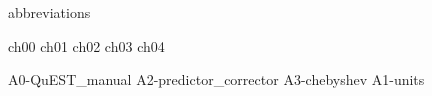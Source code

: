 \documentclass[mixedtoc]{msu-thesis-custom}
\begin{document}
\begin{center}
  \smiley{}
\end{center}



\clearpage
\SingleSpacing
\tableofcontents* %
\clearpage
\listoftables %
\clearpage
\listoffigures %

%
\makenomenclature
{abbreviations}

\mainmatter
%

{ch00}
{ch01}
{ch02}
{ch03}
{ch04}

%
%

\begin{appendices}
  {A0-QuEST_manual}
  {A2-predictor_corrector}
  {A3-chebyshev}
  {A1-units}
\end{appendices}

\backmatter
%
%
\makebibliographypage %
%
\SingleSpacing

{}


%
\end{document}
